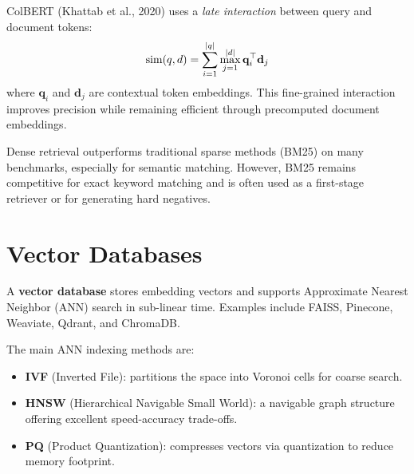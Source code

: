 \begin{definition}[ColBERT]
ColBERT (Khattab et al., 2020) uses a \emph{late interaction} between
query and document tokens:
\[
    \text{sim}(q, d) = \sum_{i=1}^{\left| q \right|} \max_{j=1}^{\left| d \right|}
    \mathbf{q}_i^\top \mathbf{d}_j
\]
where $\mathbf{q}_i$ and $\mathbf{d}_j$ are contextual token embeddings.
This fine-grained interaction improves precision while remaining
efficient through precomputed document embeddings.
\end{definition}

\begin{remark}
Dense retrieval outperforms traditional sparse methods (BM25) on many
benchmarks, especially for semantic matching. However, BM25 remains
competitive for exact keyword matching and is often used as a first-stage
retriever or for generating hard negatives.
\end{remark}

\section{Vector Databases}
\label{sec:rag:vectordb}

\begin{definition}
A \textbf{vector database} stores embedding vectors and supports
Approximate Nearest Neighbor (ANN) search in sub-linear time. Examples
include FAISS, Pinecone, Weaviate, Qdrant, and ChromaDB.
\end{definition}

\begin{proposition}
The main ANN indexing methods are:
\begin{itemize}
    \item \textbf{IVF} (Inverted File): partitions the space into
    Voronoi cells for coarse search.
    \item \textbf{HNSW} (Hierarchical Navigable Small World): a navigable
    graph structure offering excellent speed-accuracy trade-offs.
    \item \textbf{PQ} (Product Quantization): compresses vectors via
    quantization to reduce memory footprint.
\end{itemize}
\end{proposition}

